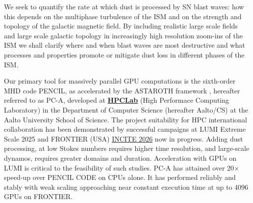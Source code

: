 \documentclass[a4paper,12pt]{article}
\begin{document}
We seek to quantify the rate at which dust is processed by SN blast waves: how
this depends on the multiphase turbulence of the ISM and on the strength and
topology of the galactic magnetic field. By including realistic large scale
fields and large scale galactic topology in increasingly high resolution
zoom-ins of the ISM we shall clarify where and when blast waves are most
destructive and what processes and properties promote or mitigate dust loss in
different phases of the ISM.

Our primary tool for massively parallel GPU computations is the sixth-order MHD
code \textsc{PENCIL}, as accelerated by the ASTAROTH framework
\citep{ASTAROTH22}, hereafter referred to as PC-A, developed at
\href{https://www.aalto.fi/en/department-of-computer-science/hpclab}{\textbf{HPCLab}}
(High Performace Computing Laboratory) in the Department of Computer Science
(hereafter Aalto/CS) at the Aalto University School of Science.  The project
suitability for HPC international collaboration has been demonstrated by
successful campaigns at LUMI Extreme Scale 2025 \citep{GMKPR26} and FRONTIER
(USA)
\href{https://www.olcf.ornl.gov/2025/04/11/incite-2026-call-for-proposals/}{INCITE
2026} now in progress. Adding dust processing, at low Stokes numbers requires
higher time resolution, and large-scale dynamos, requires greater domains and
duration.  Acceleration with GPUs on LUMI is critical to the feasibility of
such studies.  PC-A has attained over 20$\times$ speed-up over PENCIL CODE on
CPUs alone.  It has performed reliably and stably with weak scaling approaching
near constant execution time at up to 4096 GPUs on FRONTIER.
\end{document}
